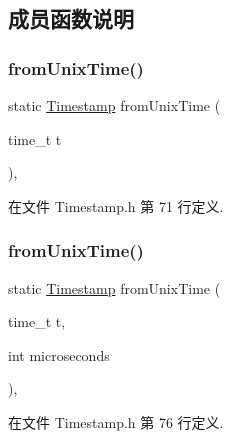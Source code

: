 \subsection{成员函数说明}
\mbox{\label{classmuduo_1_1Timestamp_aee5bf9a550a08f101f9fff5ab98f5f8b}} 
\subsubsection{\texorpdfstring{from\+Unix\+Time()}{fromUnixTime()}\hspace{0.1cm}{\footnotesize\ttfamily [1/2]}}
{\footnotesize\ttfamily static \hyperlink{classmuduo_1_1Timestamp}{Timestamp} from\+Unix\+Time (\begin{DoxyParamCaption}\item[{time\+\_\+t}]{t }\end{DoxyParamCaption})\hspace{0.3cm}{\ttfamily [inline]}, {\ttfamily [static]}}



在文件 Timestamp.\+h 第 71 行定义.

\mbox{\label{classmuduo_1_1Timestamp_a610b35a1215297acd5117d0006e64434}} 
\subsubsection{\texorpdfstring{from\+Unix\+Time()}{fromUnixTime()}\hspace{0.1cm}{\footnotesize\ttfamily [2/2]}}
{\footnotesize\ttfamily static \hyperlink{classmuduo_1_1Timestamp}{Timestamp} from\+Unix\+Time (\begin{DoxyParamCaption}\item[{time\+\_\+t}]{t,  }\item[{int}]{microseconds }\end{DoxyParamCaption})\hspace{0.3cm}{\ttfamily [inline]}, {\ttfamily [static]}}



在文件 Timestamp.\+h 第 76 行定义.



